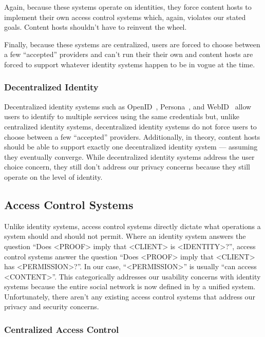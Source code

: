 \documentclass[pdftex,12pt,a4papaer]{report}
\begin{document}
Again, because these systems operate on identities, they force content hosts to
implement their own access control systems which, again, violates our stated
goals. Content hosts shouldn't have to reinvent the wheel.

Finally, because these systems are centralized, users are forced to choose
between a few ``accepted'' providers and can't run their their own and content
hosts are forced to support whatever identity systems happen to be in vogue at
the time.

\subsubsection{Decentralized Identity}

Decentralized identity systems such as OpenID~\cite{openid},
Persona~\cite{persona}, and WebID~\cite{webid} allow users to identify to
multiple services using the same credentials but, unlike centralized identity
systems, decentralized identity systems do not force users to choose between a
few ``accepted'' providers. Additionally, in theory, content hosts should be
able to support exactly one decentralized identity system --- assuming they
eventually converge. While decentralized identity systems address the user
choice concern, they still don't address our privacy concerns because they still
operate on the level of identity.

\subsection{Access Control Systems}

Unlike identity systems, access control systems directly dictate what operations
a system should and should not permit. Where an identity system answers the
question ``Does <PROOF> imply that <CLIENT> is <IDENTITY>?'', access control systems
answer the question ``Does <PROOF> imply that <CLIENT> has <PERMISSION>?''. In our
case, ``<PERMISSION>'' is usually ``can access <CONTENT>''. This categorically
addresses our usability concerns with identity systems because the entire social
network is now defined in by a unified system. Unfortunately, there aren't any
existing access control systems that address our privacy and security concerns.

\subsubsection{Centralized Access Control}
\end{document}
